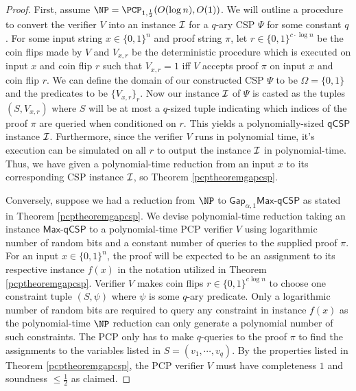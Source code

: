 \begin{proof}
First, assume $\NP = \PCP_{1,\frac{1}{2}}(O(\log{n}), O(1))$. We will outline a procedure to convert the verifier $V$ into an instance $\mathcal{I}$ for a $q$-ary CSP $\Psi$ for some constant $q$. For some input string $x \in \{0,1\}^n$ and proof string $\pi$, let $r \in \{0,1\}^{c \cdot \log{n}}$ be the coin flips made by $V$ and $V_{x,r}$ be the deterministic procedure which is executed on input $x$ and coin flip $r$ such that $V_{x,r} = 1$ iff $V$ accepts proof $\pi$ on input $x$ and coin flip $r$. We can define the domain of our constructed CSP $\Psi$ to be $\Omega=\{0,1\}$ and the predicates to be $\{V_{x,r}\}_{r}$. Now our instance $\mathcal{I}$ of $\Psi$ is casted as the tuples $(S, V_{x,r})$ where $S$ will be at most a $q$-sized tuple indicating which indices of the proof $\pi$ are queried when conditioned on $r$. This yields a polynomially-sized $\mathsf{qCSP}$ instance $\mathcal{I}$. Furthermore, since the verifier $V$ runs in polynomial time, it's execution can be simulated on all $r$ to output the instance $\mathcal{I}$ in polynomial-time. Thus, we have given a polynomial-time reduction from an input $x$ to its corresponding CSP instance $\mathcal{I}$, so Theorem \ref{pcptheoremgapcsp}. \newline

Conversely, suppose we had a reduction from $\NP$ to $\mathsf{Gap}_{\alpha,1}\mathsf{Max}$-$\mathsf{qCSP}$ as stated in Theorem \ref{pcptheoremgapcsp}. We devise polynomial-time reduction taking an instance $\mathsf{Max}$-$\mathsf{qCSP}$ to a polynomial-time PCP verifier $V$ using logarithmic number of random bits and a constant number of queries to the supplied proof $\pi$. For an input $x \in \{0,1\}^n$, the proof will be expected to be an assignment to its respective instance $f(x)$ in the notation utilized in Theorem \ref{pcptheoremgapcsp}. Verifier $V$ makes coin flips $r \in \{0,1\}^{c\log{n}}$ to choose one constraint tuple $(S,\psi)$ where $\psi$ is some $q$-ary predicate. Only a logarithmic number of random bits are required to query any constraint in instance $f(x)$ as the polynomial-time $\NP$ reduction can only generate a polynomial number of such constraints.  The PCP only has to make $q$-queries to the proof $\pi$ to find the assignments to the variables listed in $S = (v_1,\cdots,v_q)$. By the properties listed in Theorem \ref{pcptheoremgapcsp}, the PCP verifier $V$ must have completeness $1$ and soundness $\leq \frac{1}{2}$ as claimed.
\end{proof}

